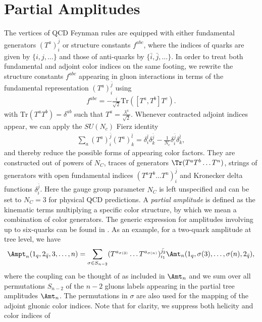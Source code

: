 \section{Partial Amplitudes}
\label{sec:partamp}
The vertices of QCD Feynman
rules are equipped with either fundamental generators
$(T^a)_i^{\bar{j}}$ or structure constants $f^{abc}$, where the indices of quarks are given by $\{i,j,\dots\}$ and those
of anti-quarks by $\{\bar{i},\bar{j},\dots\}$. In order to treat both fundamental and adjoint color indices on the
same footing, we rewrite the structure constants $f^{abc}$ appearing in gluon
interactions in terms of the fundamental representation $(T^a)_i^{\bar
  j}$ using 
\begin{align}\label{eq:repcs}
f^{abc} = - \frac{i}{\sqrt{2}}\text{Tr}\left([T^a,T^b]T^c\right).
\end{align}
with $\text{Tr}(T^aT^b) = \delta^{ab}$ such
that $T^a=\frac{\lambda^a}{\sqrt{2}}$. Whenever contracted adjoint
indices appear, we can apply the $SU(N_c)$ Fierz identity
\begin{align}\label{eq:fierz}
\sum_a (T^a)_i^{\bar j} (T^a)_k^{\bar l} = \delta_i^{\bar l} \delta_k^{\bar j} - \frac{1}{N_c}  \delta_i^{\bar j} \delta_k^{\bar l},
\end{align}
and thereby reduce the possible forms of appearing color factors. They
are constructed out of powers of $N_C$, traces
of generators $\Tr(T^aT^b\dots T^n)$, strings of generators with open
fundamental indices $(T^aT^b\dots T^n)_i^{\bar{j}}$ and Kronecker delta functions
$\delta_i^{\bar{j}}$. Here the gauge group parameter $N_C$ is left
unspecified and can be set to $N_C=3$ for physical QCD predictions. A \textit{partial amplitude} is defined as the kinematic terms multiplying a
specific color structure, by which we mean a combination of color generators. The generic expression for amplitudes involving up to six-quarks can
be found in \cite{Ita:2011ar}. As an example, for a two-quark amplitude at
tree level, we have
\begin{align}
  \Ampt_n  (1_q,2_{\bar q},3,\dots,n)=\sum_{\sigma \in
   S_{n-2}}(T^{a_{\sigma(3)}} \dots
 T^{a_{\sigma(n)}})_{i_1}^{\bar{j_2}}\Amt_n(1_q,\sigma(3),\dots,
 \sigma(n),2_{\bar{q}}),
\end{align}
where the coupling can be thought of as included in $\Amt_n$ and we sum over all permutations
$S_{n-2}$ of the $n-2$ gluons labels appearing in the partial tree
amplitudes $\Amt_n$. The permutations in $\sigma$ are also used for
the mapping of the adjoint gluonic
color indices. Note that for clarity, we suppress both helicity and color indices of
